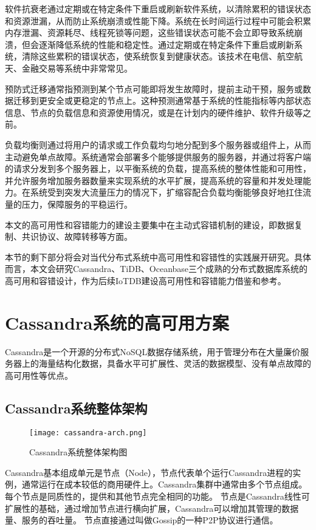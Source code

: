 软件抗衰老通过定期或在特定条件下重启或刷新软件系统，以清除累积的错误状态和资源泄漏，从而防止系统崩溃或性能下降。系统在长时间运行过程中可能会积累内存泄漏、资源耗尽、线程死锁等问题，这些错误状态可能不会立即导致系统崩溃，但会逐渐降低系统的性能和稳定性。通过定期或在特定条件下重启或刷新系统，清除这些累积的错误状态，使系统恢复到健康状态。该技术在电信、航空航天、金融交易等系统中非常常见。

预防式迁移通常指预测到某个节点可能即将发生故障时，提前主动干预，服务或数据迁移到更安全或更稳定的节点上。这种预测通常基于系统的性能指标等内部状态信息、节点的负载信息和资源使用情况，或是在计划内的硬件维护、软件升级等之前。

负载均衡则通过将用户的请求或工作负载均匀地分配到多个服务器或组件上，从而主动避免单点故障。系统通常会部署多个能够提供服务的服务器，并通过将客户端的请求分发到多个服务器上，以平衡系统的负载，提高系统的整体性能和可用性，并允许服务增加服务器数量来实现系统的水平扩展，提高系统的容量和并发处理能力。在系统受到突发大流量压力的情况下，扩缩容配合负载均衡能够良好地扛住流量的压力，保障服务的平稳运行。



本文的高可用性和容错能力的建设主要集中在主动式容错机制的建设，即数据复制、共识协议、故障转移等方面。

本节的剩下部分将会对当代分布式系统中高可用性和容错性的实践展开研究。具体而言，本文会研究Cassandra、TiDB、Oceanbase三个成熟的分布式数据库系统的高可用和容错设计，作为后续IoTDB建设高可用性和容错能力借鉴和参考。



\section{Cassandra系统的高可用方案}
Cassandra\cite{lakshman2010cassandra}是一个开源的分布式NoSQL数据存储系统，用于管理分布在大量廉价服务器上的海量结构化数据，具备水平可扩展性、灵活的数据模型、没有单点故障的高可用性等优点。

\subsection{Cassandra系统整体架构}

\begin{figure}
  \centering
  \texttt{[image: cassandra-arch.png]}
  \caption{Cassandra系统整体架构图}
  \label{fig:cassandra-arch}
\end{figure}

Cassandra基本组成单元是节点（Node），节点代表单个运行Cassandra进程的实例，通常运行在成本较低的商用硬件上。Cassandra集群中通常由多个节点组成。每个节点是同质性的，提供和其他节点完全相同的功能。
节点是Cassandra线性可扩展性的基础，通过增加节点进行横向扩展，Cassandra可以增加其管理的数据量、服务的吞吐量。
节点直接通过叫做Gossip的一种P2P协议进行通信。

